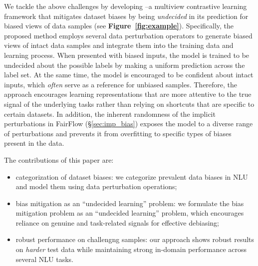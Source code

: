 We tackle the above challenges by developing \OursName--a multiview contrastive learning framework that mitigates dataset biases by being {\em undecided} in its prediction for biased views of data samples (see \textbf{Figure~\ref{fig:example}}). Specifically, the proposed method employs several data perturbation operators to generate biased views of intact data samples and integrate them into the training data and learning process. 
When presented with biased inputs, the model is trained to be undecided about the possible labels by making a uniform prediction across the label set. At the same time, the model is encouraged to be confident about intact inputs, which {\em often} serve as a reference for unbiased samples. Therefore, the approach encourages learning representations that are more attentive to the true signal of the underlying tasks rather than relying on shortcuts that are specific to certain datasets. 
In addition, the inherent randomness of the implicit perturbations in FairFlow (\S\ref{sec:imp_bias}) exposes the model to a diverse range of perturbations and prevents it from overfitting to specific types of biases present in the data.

The contributions of this paper are: 
\begin{itemize}
    \itemsep-1pt 
    \item categorization of dataset biases: we categorize prevalent data biases in NLU and model them using data perturbation operations;
    
    \item bias mitigation as an ``undecided learning'' problem: we formulate the bias mitigation problem as an ``undecided learning'' problem, which encourages reliance on genuine and task-related signals for effective debiasing;  
    \item robust performance on challengng samples: our approach shows robust results on {\em harder} test data while maintaining strong in-domain performance across several NLU tasks.
\end{itemize}

